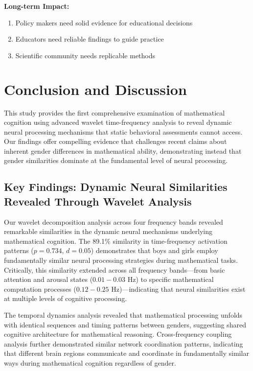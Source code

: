 \documentclass[pdflatex,reference]{sn-jnl}%
\theoremstyle{thmstyleone}%
\theoremstyle{thmstyletwo}%
\theoremstyle{thmstylethree}%
\begin{document}
\medskip\noindent
\textbf{Long-term Impact:}
\begin{enumerate}
\item Policy makers need solid evidence for educational decisions
\item Educators need reliable findings to guide practice
\item Scientific community needs replicable methods
\end{enumerate}


\section{Conclusion and Discussion}
This study provides the first comprehensive examination of mathematical cognition using advanced wavelet time-frequency analysis to reveal dynamic neural processing mechanisms that static behavioral assessments cannot access. Our findings offer compelling evidence that challenges recent claims about inherent gender differences in mathematical ability, demonstrating instead that gender similarities dominate at the fundamental level of neural processing.


\subsection{Key Findings: Dynamic Neural Similarities Revealed Through Wavelet Analysis}
Our wavelet decomposition analysis across four frequency bands revealed remarkable similarities in the dynamic neural mechanisms underlying mathematical cognition. The 89.1\% similarity in time-frequency activation patterns ($p = 0.734$, $d = 0.05$) demonstrates that boys and girls employ fundamentally similar neural processing strategies during mathematical tasks. Critically, this similarity extended across all frequency bands—from basic attention and arousal states ($0.01-0.03$ Hz) to specific mathematical computation processes ($0.12-0.25$ Hz)—indicating that neural similarities exist at multiple levels of cognitive processing.

The temporal dynamics analysis revealed that mathematical processing unfolds with identical sequences and timing patterns between genders, suggesting shared cognitive architecture for mathematical reasoning. Cross-frequency coupling analysis further demonstrated similar network coordination patterns, indicating that different brain regions communicate and coordinate in fundamentally similar ways during mathematical cognition regardless of gender.
\end{document}
